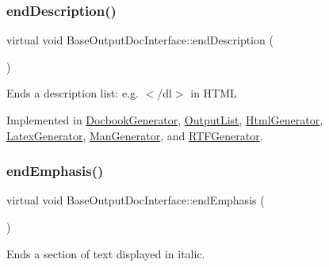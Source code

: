 \mbox{\label{class_base_output_doc_interface_ac25c565e9fd8aee6c2b0d9b71fcff380}} 
\subsubsection{\texorpdfstring{endDescription()}{endDescription()}}
{\footnotesize\ttfamily virtual void Base\+Output\+Doc\+Interface\+::end\+Description (\begin{DoxyParamCaption}{ }\end{DoxyParamCaption})\hspace{0.3cm}{\ttfamily [pure virtual]}}

Ends a description list\+: e.\+g. {\ttfamily $<$/dl$>$} in H\+T\+ML 

Implemented in \mbox{\hyperlink{class_docbook_generator_accbb80f6730221e3396f38cbb07ed7b5}{Docbook\+Generator}}, \mbox{\hyperlink{class_output_list_a231f2150bf8b3d9823cb1f201ecc6774}{Output\+List}}, \mbox{\hyperlink{class_html_generator_aff598e78fc1ebaefb21fe94fda564e4d}{Html\+Generator}}, \mbox{\hyperlink{class_latex_generator_a3da64ef2d6cfe58facd7a35ad736ea83}{Latex\+Generator}}, \mbox{\hyperlink{class_man_generator_a04db9176fd114182d5aab2a48346621d}{Man\+Generator}}, and \mbox{\hyperlink{class_r_t_f_generator_a4c9b42e803206c575f464d82eec460d9}{R\+T\+F\+Generator}}.

\mbox{\label{class_base_output_doc_interface_aed2cf04d82648509f97403bd4ce62590}} 
\subsubsection{\texorpdfstring{endEmphasis()}{endEmphasis()}}
{\footnotesize\ttfamily virtual void Base\+Output\+Doc\+Interface\+::end\+Emphasis (\begin{DoxyParamCaption}{ }\end{DoxyParamCaption})\hspace{0.3cm}{\ttfamily [pure virtual]}}

Ends a section of text displayed in italic. 

